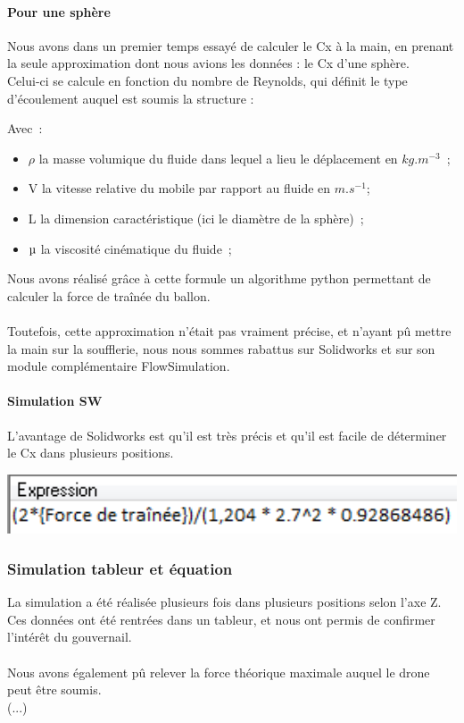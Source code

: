 \documentclass[a4paper,11pt]{article}
\begin{document}
\paragraph{Pour une sphère}
	Nous avons dans un premier temps essayé de calculer le Cx à la main, en prenant la seule approximation dont nous avions les données : le Cx d'une sphère.\\
	Celui-ci se calcule en fonction du nombre de Reynolds, qui définit le type d'écoulement auquel est soumis la structure :
	\begin{center}
  \end{center}
	Avec~:
  \begin{itemize}
	 \item $\rho$ la masse volumique du fluide dans lequel a lieu le déplacement en $kg.m^{-3}$~;
   \item V la vitesse relative du mobile par rapport au fluide en $m.s^{-1}$;
   \item L la dimension caractéristique (ici le diamètre de la sphère)~;
   \item $\micro$ la viscosité cinématique du fluide~;
  \end{itemize}
	Nous avons réalisé grâce à cette formule un algorithme python permettant de calculer la force de traînée du ballon.\\
	\\
	Toutefois, cette approximation n'était pas vraiment précise, et n'ayant pû mettre la main sur la soufflerie, nous nous sommes rabattus sur Solidworks et sur son module complémentaire FlowSimulation.
\paragraph{Simulation SW}
	L'avantage de Solidworks est qu'il est très précis et qu'il est facile de déterminer le Cx dans plusieurs positions.\\
	\begin{center}
		\includegraphics[width=15cm]{../Images/expressionCX.png}
	\end{center}

\subsubsection{Simulation tableur et équation}
	La simulation a été réalisée plusieurs fois dans plusieurs positions selon l'axe Z.\\
	Ces données ont été rentrées dans un tableur, et nous ont permis de confirmer l'intérêt du gouvernail.\\
	\\
	Nous avons également pû relever la force théorique maximale auquel le drone peut être soumis.\\
	(...)
\end{document}
